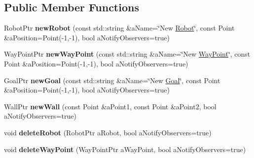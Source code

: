\subsection*{Public Member Functions}
\begin{DoxyCompactItemize}
\item 
Robot\+Ptr {\bfseries new\+Robot} (const std\+::string \&a\+Name=\char`\"{}New \hyperlink{class_model_1_1_robot}{Robot}\char`\"{}, const Point \&a\+Position=Point(-\/1,-\/1), bool a\+Notify\+Observers=true)\hypertarget{class_model_1_1_robot_world_af0d58001395b3b375c2a98b28f2f3ef2}{}\label{class_model_1_1_robot_world_af0d58001395b3b375c2a98b28f2f3ef2}

\item 
Way\+Point\+Ptr {\bfseries new\+Way\+Point} (const std\+::string \&a\+Name=\char`\"{}New \hyperlink{class_model_1_1_way_point}{Way\+Point}\char`\"{}, const Point \&a\+Position=Point(-\/1,-\/1), bool a\+Notify\+Observers=true)\hypertarget{class_model_1_1_robot_world_a45272003383e53e4d8273e83a3e7dc7f}{}\label{class_model_1_1_robot_world_a45272003383e53e4d8273e83a3e7dc7f}

\item 
Goal\+Ptr {\bfseries new\+Goal} (const std\+::string \&a\+Name=\char`\"{}New \hyperlink{class_model_1_1_goal}{Goal}\char`\"{}, const Point \&a\+Position=Point(-\/1,-\/1), bool a\+Notify\+Observers=true)\hypertarget{class_model_1_1_robot_world_afc21f82cc1c2c65655da7ef6a7e0f6e5}{}\label{class_model_1_1_robot_world_afc21f82cc1c2c65655da7ef6a7e0f6e5}

\item 
Wall\+Ptr {\bfseries new\+Wall} (const Point \&a\+Point1, const Point \&a\+Point2, bool a\+Notify\+Observers=true)\hypertarget{class_model_1_1_robot_world_a8b3d9243b9550a6fe01bc3b880fadec5}{}\label{class_model_1_1_robot_world_a8b3d9243b9550a6fe01bc3b880fadec5}

\item 
void {\bfseries delete\+Robot} (Robot\+Ptr a\+Robot, bool a\+Notify\+Observers=true)\hypertarget{class_model_1_1_robot_world_aa6d7a030f609d6b1187b1c5e93469695}{}\label{class_model_1_1_robot_world_aa6d7a030f609d6b1187b1c5e93469695}

\item 
void {\bfseries delete\+Way\+Point} (Way\+Point\+Ptr a\+Way\+Point, bool a\+Notify\+Observers=true)\hypertarget{class_model_1_1_robot_world_afbb97c93d8d68e6e624af6fc988b57ca}{}\label{class_model_1_1_robot_world_afbb97c93d8d68e6e624af6fc988b57ca}


\end{DoxyCompactItemize}
